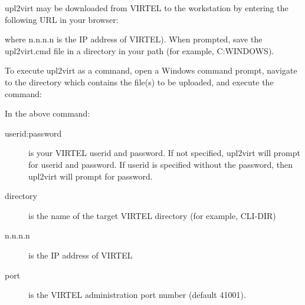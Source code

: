 \documentclass[letterpaper,10pt,english]{sphinxmanual}
\begin{document}

upl2virt may be downloaded from VIRTEL to the workstation by entering the following URL in your browser:

\begin{sphinxVerbatim}[commandchars=\\\{\}]
\end{sphinxVerbatim}

where n.n.n.n is the IP address of VIRTEL). When prompted, save the upl2virt.cmd file in a directory in your path (for example, C:WINDOWS).


\ignorespaces 
To execute upl2virt as a command, open a Windows command prompt, navigate to the directory which contains the file(s) to be uploaded, and execute the command:

\begin{sphinxVerbatim}[commandchars=\\\{\}]
 \PYG{p}{[} \PYG{p}{]}    
         \PYG{p}{[} \PYG{p}{]} \PYG{p}{[}\PYG{p}{]} \PYG{p}{[} \PYG{p}{]} \PYG{p}{[}\PYG{p}{]} \PYG{p}{[}  \PYG{p}{]}
\end{sphinxVerbatim}

In the above command:
\begin{description}
\item[{userid:password}] \leavevmode
is your VIRTEL userid and password. If not specified, upl2virt will prompt for userid and password. If userid is specified without the password, then upl2virt will prompt for password.

\item[{directory}] \leavevmode
is the name of the target VIRTEL directory (for example, CLI-DIR)

\item[{n.n.n.n}] \leavevmode
is the IP address of VIRTEL

\item[{port}] \leavevmode
is the VIRTEL administration port number (default 41001).

\end{description}
\end{document}
